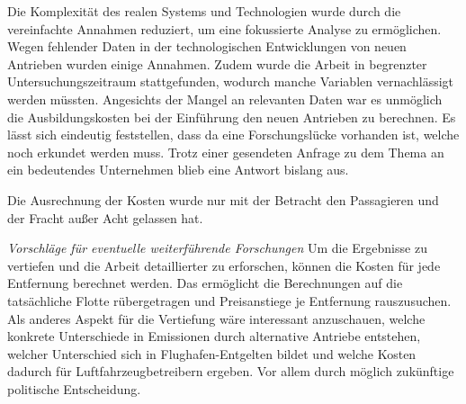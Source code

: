 Die Komplexität des realen Systems und Technologien wurde durch die vereinfachte Annahmen reduziert, um eine fokussierte Analyse zu ermöglichen.
Wegen fehlender Daten in der technologischen Entwicklungen von neuen Antrieben wurden einige Annahmen.
Zudem wurde die Arbeit in begrenzter Untersuchungszeitraum stattgefunden, wodurch manche Variablen vernachlässigt werden müssten.
%
Angesichts der Mangel an relevanten Daten war es unmöglich die Ausbildungskosten bei der Einführung den neuen Antrieben zu berechnen.
Es lässt sich eindeutig feststellen, dass da eine Forschungslücke vorhanden ist, welche noch erkundet werden muss. 
Trotz einer gesendeten Anfrage zu dem Thema an ein bedeutendes Unternehmen blieb eine Antwort bislang aus.

Die Ausrechnung der Kosten wurde nur mit der Betracht den Passagieren und der Fracht außer Acht gelassen hat. 

\textit{Vorschläge für eventuelle weiterführende Forschungen}
Um die Ergebnisse zu vertiefen und die Arbeit detaillierter zu erforschen, können die Kosten für jede Entfernung berechnet werden.
Das ermöglicht die Berechnungen auf die tatsächliche Flotte rübergetragen und Preisanstiege je Entfernung rauszusuchen.
Als anderes Aspekt für die Vertiefung wäre interessant anzuschauen, welche konkrete Unterschiede in Emissionen durch 
alternative Antriebe entstehen, welcher Unterschied sich in Flughafen-Entgelten bildet und welche Kosten dadurch
für Luftfahrzeugbetreibern ergeben. Vor allem durch möglich zukünftige politische Entscheidung.


